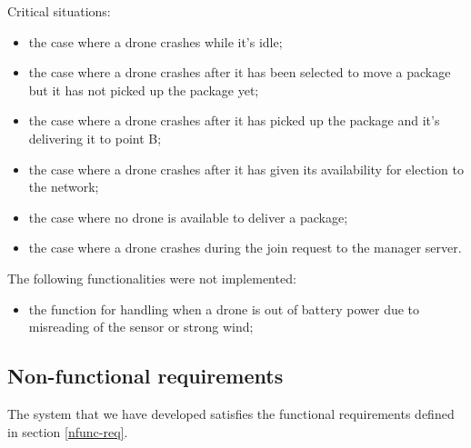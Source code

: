 \documentclass[a4paper, oneside]{memoir}
\begin{document}
Critical situations:
\begin{itemize}
	\item the case where a drone crashes while it's idle;
	\item the case where a drone crashes after it has been selected to move a package but it has not picked up the package yet;
	\item the case where a drone crashes after it has picked up the package and it's delivering it to point B;
	\item the case where a drone crashes after it has given its availability for election to the network;
	\item the case where no drone is available to deliver a package;
	\item the case where a drone crashes during the join request to the manager server.
\end{itemize}

The following functionalities were not implemented:
\begin{itemize}
	\item the function for handling when a drone is out of battery power due to misreading of the sensor or strong wind;
\end{itemize}





\subsection{Non-functional requirements}
The system that we have developed satisfies the functional requirements defined in section \ref{nfunc-req}.
\end{document}
